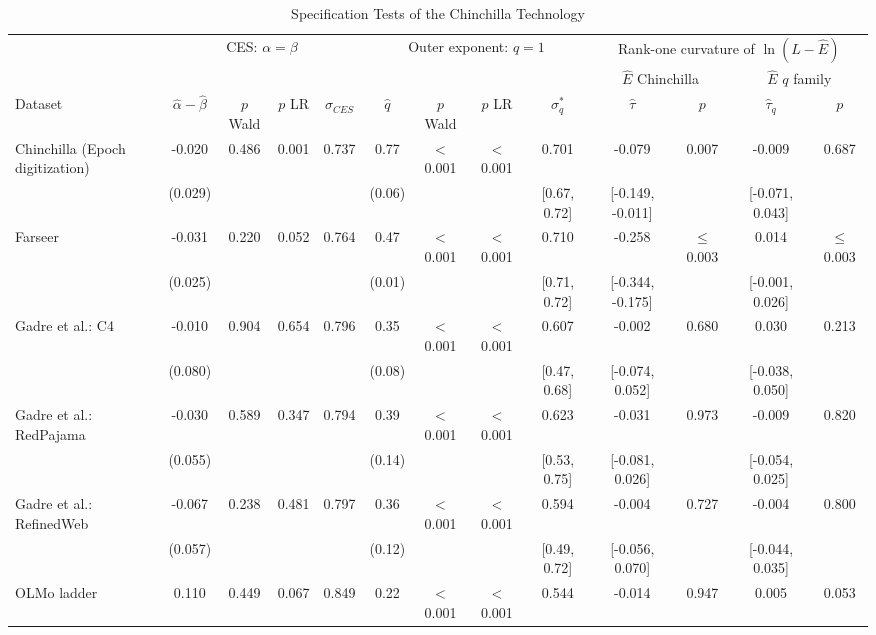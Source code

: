 \begin{landscape}
\begin{table}[!htbp]
\centering
\footnotesize
\caption{Specification Tests of the Chinchilla Technology}
\label{tab:spectests}
\begin{threeparttable}
\begin{tabular}{lcccccccccccc}
\toprule
& \multicolumn{4}{c}{CES: $\alpha=\beta$} & \multicolumn{4}{c}{Outer exponent: $q=1$} & \multicolumn{4}{c}{Rank-one curvature of $\ln(L-\hat E)$} \\
\cmidrule(lr){2-5}\cmidrule(lr){6-9}\cmidrule(lr){10-13}
& & & & & & & & & \multicolumn{2}{c}{$\hat E$ Chinchilla} & \multicolumn{2}{c}{$\hat E$ $q$ family} \\
\cmidrule(lr){10-11}\cmidrule(lr){12-13}
Dataset & $\hat\alpha-\hat\beta$ & $p$ Wald & $p$ LR & $\sigma_{CES}$ & $\hat q$ & $p$ Wald & $p$ LR & $\sigma^*_q$ & $\hat\tau$ & $p$ & $\hat\tau_q$ & $p$ \\
\midrule
Chinchilla (Epoch digitization) & -0.020 & 0.486 & 0.001 & 0.737 & 0.77 & $<$0.001 & $<$0.001 & 0.701 & -0.079 & 0.007 & -0.009 & 0.687 \\
 & (0.029) &  &  &  & (0.06) &  &  & [0.67, 0.72] & [-0.149, -0.011] &  & [-0.071, 0.043] &  \\[2pt]
Farseer & -0.031 & 0.220 & 0.052 & 0.764 & 0.47 & $<$0.001 & $<$0.001 & 0.710 & -0.258 & $\leq$0.003 & 0.014 & $\leq$0.003 \\
 & (0.025) &  &  &  & (0.01) &  &  & [0.71, 0.72] & [-0.344, -0.175] &  & [-0.001, 0.026] &  \\[2pt]
Gadre et al.: C4 & -0.010 & 0.904 & 0.654 & 0.796 & 0.35 & $<$0.001 & $<$0.001 & 0.607 & -0.002 & 0.680 & 0.030 & 0.213 \\
 & (0.080) &  &  &  & (0.08) &  &  & [0.47, 0.68] & [-0.074, 0.052] &  & [-0.038, 0.050] &  \\[2pt]
Gadre et al.: RedPajama & -0.030 & 0.589 & 0.347 & 0.794 & 0.39 & $<$0.001 & $<$0.001 & 0.623 & -0.031 & 0.973 & -0.009 & 0.820 \\
 & (0.055) &  &  &  & (0.14) &  &  & [0.53, 0.75] & [-0.081, 0.026] &  & [-0.054, 0.025] &  \\[2pt]
Gadre et al.: RefinedWeb & -0.067 & 0.238 & 0.481 & 0.797 & 0.36 & $<$0.001 & $<$0.001 & 0.594 & -0.004 & 0.727 & -0.004 & 0.800 \\
 & (0.057) &  &  &  & (0.12) &  &  & [0.49, 0.72] & [-0.056, 0.070] &  & [-0.044, 0.035] &  \\[2pt]
OLMo ladder & 0.110 & 0.449 & 0.067 & 0.849 & 0.22 & $<$0.001 & $<$0.001 & 0.544 & -0.014 & 0.947 & 0.005 & 0.053 \\

\end{tabular}
\end{threeparttable}
\end{table}
\end{landscape}
